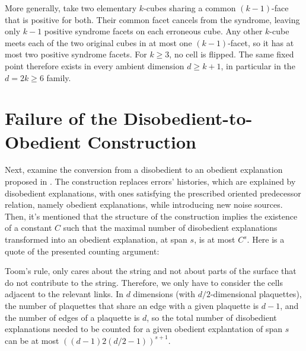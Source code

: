\documentclass[manuscript,screen,review]{acmart}
\begin{document}
More generally, take two elementary $k$-cubes sharing a common
$(k-1)$-face that is positive for both. Their common facet cancels
from the syndrome, leaving only $k-1$ positive syndrome facets on
each erroneous cube. Any other $k$-cube meets each of the two
original cubes in at most one $(k-1)$-facet, so it has at most
two positive syndrome facets. For $k\ge3$, no cell is flipped.
The same fixed point therefore exists in every ambient dimension
$d\ge k+1$, in particular in the $d=2k\ge6$ family.



\section{Failure of the Disobedient-to-Obedient Construction}

Next, examine the conversion from a disobedient to an obedient explanation proposed in \cite[pp.~105--108]{Ahn2004}. The construction replaces errors' histories, which are explained by disobedient explanations, with ones satisfying the prescribed oriented predecessor relation, namely obedient explanations, while introducing new noise sources. Then, it's mentioned that the structure of the construction implies the existence of a constant $C$ such that the maximal number of disobedient explanations transformed into an obedient explanation, at span $s$, is at most $C^{s}$. Here is a quote of the presented counting argument:

\begin{framed}
  Toom's rule, only cares about the string and not about parts of the surface that do not contribute to the string. Therefore, we only have to consider the cells adjacent to the relevant links. In $d$ dimensions (with $d/2$-dimensional plaquettes), the number of plaquettes that share an edge with a given plaquette is $d-1$, and the number of edges of a plaquette is $d$, so the total number of disobedient explanations needed to be counted for a given obedient explantation of span $s$ can be at most $(( d-1) 2(d/2 -1))^{s+1}$.   
\end{framed}


\paragraph{}

\end{document}

